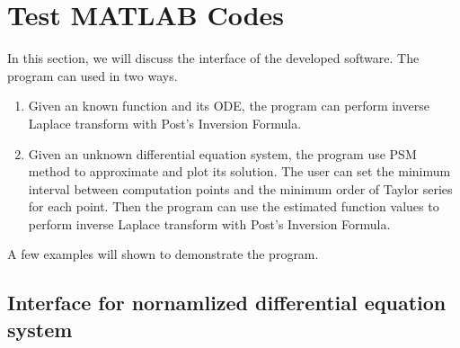 \documentclass[12pt]{article}
\begin{document}
\section{Test MATLAB Codes}

In this section, we will discuss the interface of the developed software. The program can used in two ways.
\begin{enumerate}
\item Given an known function and its ODE, the program can perform inverse Laplace transform with Post's Inversion Formula.
\item Given an unknown differential equation system, the program use PSM method to approximate and plot its solution. The user can set the minimum interval between computation points and the minimum order of Taylor series for each point.
Then the program can use the estimated function values to perform inverse Laplace transform with Post's Inversion Formula.
\end{enumerate}
A few examples will shown to demonstrate the program.

\subsection{Interface for nornamlized differential equation system}
\end{document}
